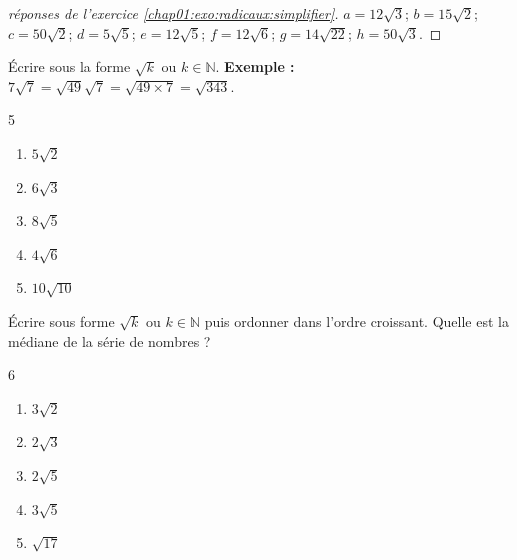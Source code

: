 \begin{proof}[réponses de l'exercice \ref{chap01:exo:radicaux:simplifier}] 
	$a=12\sqrt{3}$; $b=15\sqrt{2}$; $c=50\sqrt{2}$; $d=5\sqrt{5}$; $e=12\sqrt{5}$; $f=12\sqrt{6}$; $g=14\sqrt{22}$; $h=50\sqrt{3}$.
\end{proof}

\newpage  
\begin{exercise} Écrire sous la forme $\sqrt{k}$ ou $k\in\mathbb{N}$. \textbf{Exemple : }  $7\sqrt{7}=\sqrt{49}\sqrt{7}=\sqrt{49\times 7}=\sqrt{343}$.
	\begin{multicols}{5}
		\begin{enumerate}[label={\alph*)}, leftmargin=*] 
			\item $5\sqrt{2}$
			\item $6\sqrt{3}$
			\item $8\sqrt{5}$
			\item $4\sqrt{6}$ 
			\item $10\sqrt{10}$  
		\end{enumerate}
	\end{multicols}
\end{exercise} 
\begin{exercise}\hfill 
	Écrire sous forme $\sqrt{k}$ ou $k\in\mathbb{N}$ puis ordonner dans l'ordre croissant. Quelle est la médiane de la série de nombres ?
	\begin{multicols}{6}
		\begin{enumerate}[label={\alph*)}, leftmargin=*] 
			\item $3\sqrt{2}$
			\item $2\sqrt{3}$
			\item $2\sqrt{5}$
			\item $3\sqrt{5}$ 
			\item $\sqrt{17}$  
		\end{enumerate}
	\end{multicols}
\end{exercise}
%	
